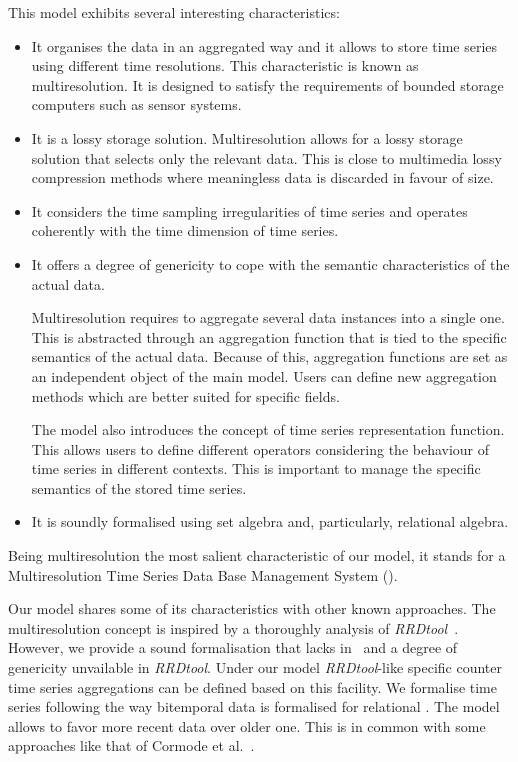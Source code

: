 This model exhibits several interesting characteristics:
\begin{itemize}
\item It organises the data in an aggregated way and it allows to
  store time series using different time resolutions. This
  characteristic is known as multiresolution. It is designed to
  satisfy the requirements of bounded storage computers such as sensor
  systems.

\item It is a lossy storage solution. Multiresolution allows for a
  lossy storage solution that selects only the relevant data. This is
  close to multimedia lossy compression methods where meaningless data
  is discarded in favour of size. 

\item It considers the time sampling irregularities of time series and
  operates coherently with the time dimension of time series.

\item It offers a degree of genericity to cope with the semantic
  characteristics of the actual data. 

  Multiresolution requires to aggregate several data instances into a
  single one. This is abstracted through an aggregation function that
  is tied to the specific semantics of the actual data. Because of
  this, aggregation functions are set as an independent object of the
  main model.  Users can define new aggregation methods which are
  better suited for specific fields.

  The model also introduces the concept of time series representation
  function.  This allows users to define different operators
  considering the behaviour of time series in different contexts. This
  is important to manage the specific semantics of the stored time
  series. 

\item It is soundly formalised using set algebra and, particularly,
  relational algebra.
\end{itemize}

Being multiresolution the most salient characteristic of our model, it
stands for a Multiresolution Time Series Data Base Management System
().

Our model shares some of its characteristics with other known
approaches.
%
The multiresolution concept is inspired by a thoroughly analysis of
\emph{RRDtool}~\cite{rrdtool}. However, we provide a sound
formalisation that lacks in~\cite{rrdtool} and a degree of genericity
unvailable in \emph{RRDtool}. Under our model \emph{RRDtool}-like
specific counter time series aggregations can be defined based on this
facility.
%
We formalise time series following the way bitemporal data is
formalised for relational .
%
The model allows to favor more recent data over older one. This is in
common with some approaches like that of Cormode et
al.~\cite{cormode08:pods}.


